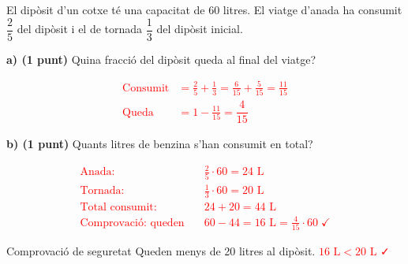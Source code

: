 \documentclass[a4paper, 11pt]{article}
\begin{document}
\noindent El dipòsit d'un cotxe té una capacitat de 60 litres. El viatge d'anada ha consumit $\dfrac{2}{5}$ del dipòsit i el de tornada $\dfrac{1}{3}$ del dipòsit inicial.

\noindent\textbf{a) (1 punt)} Quina fracció del dipòsit queda al final del viatge?

\textcolor{red}{
\begin{align*}
\text{Consumit} &= \frac{2}{5} + \frac{1}{3} = \frac{6}{15} + \frac{5}{15} = \frac{11}{15} \\[0.4em]
\text{Queda} &= 1 - \frac{11}{15} = \boxed{\dfrac{4}{15}}
\end{align*}
}
\vspace{0.3cm}

\noindent\textbf{b) (1 punt)} Quants litres de benzina s'han consumit en total?

\textcolor{red}{
\begin{align*}
\text{Anada:} &\quad \frac{2}{5} \cdot 60 = 24 \text{ L} \\[0.3em]
\text{Tornada:} &\quad \frac{1}{3} \cdot 60 = 20 \text{ L} \\[0.3em]
\text{Total consumit:} &\quad 24 + 20 = \boxed{44 \text{ L}} \\[0.3em]
\text{Comprovació: queden} &\quad 60 - 44 = 16 \text{ L} = \frac{4}{15}\cdot 60 \; \checkmark
\end{align*}
}

\begin{infobox}[colback=blue!5, colframe=blue!30]{Comprovació de seguretat}
    Queden menys de 20 litres al dipòsit. \quad \textcolor{red}{$16\text{ L} < 20\text{ L}$ ✓}
\end{infobox}

\newpage\null\newpage
\end{document}
